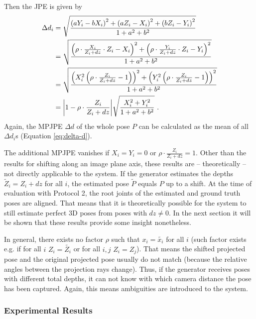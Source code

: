 Then the JPE  is given by 
\begin{align}
	\label{eq:z-shift-error}
	\Delta d_i &= \sqrt{\frac{\left (a Y_i - b X_i \right )^2 + \left (a Z_i - X_i \right )^2 + \left (b Z_i - Y_i \right )^2}{1 + a^2 + b^2}} \\ 
	&= \sqrt{\frac{\left (\rho \cdot \frac{X_i}{Z_i + dz}\cdot Z_i - X_i \right )^2 + \left (\rho \cdot \frac{Y_i }{Z_i + dz}\cdot Z_i- Y_i \right )^2}{1 + a^2 + b^2}} \\
	&= \sqrt{\frac{\left (X_i^2 \left (\rho \cdot \frac{Z_i}{Z_i + dz} - 1 \right) \right )^2 + \left (Y_i^2 \left (\rho \cdot \frac{Z_i}{Z_i + dz}-1 \right ) \right )^2}{1 + a^2 + b^2}} \\
	&= \abs{1 - \rho \cdot \frac{Z_i}{Z_i + dz}}  \sqrt{\frac{X_i^2 + Y_i^2}{1 + a^2 + b^2}}\ .
\end{align}
Again, the MPJPE $\Delta d$ of the whole pose $P$ can be calculated as the mean of all $\Delta d_i$s (Equation \eqref{eq:delta-d}).

The additional MPJPE vanishes if $X_i = Y_i = 0$ or $\rho \cdot \frac{Z_i}{Z_i + dz} = 1$.
Other than the results for shifting along an image plane axis, these results are -- theoretically -- not directly applicable to the system.
If the generator estimates the depths $\widetilde{Z}_i = Z_i + dz$ for all $i$, the estimated pose $\widetilde{P}$ equals $P$ up to a shift.
At the time of evaluation with Protocol 2, the root joints of the estimated and ground truth poses are aligned.
That means that it is theoretically possible for the system to still estimate perfect 3D poses from poses with $dz \neq 0$.
In the next section it will be shown that these results provide some insight nonetheless.

In general, there exists no factor $\rho$ such that $x_i = \widetilde{x_i}$ for all $i$ (such factor exists e.g. if for all $i$ $Z_i = \widetilde{Z_i}$ or for all $i, j$ $Z_i = Z_j$).
That means the shifted projected pose and the original projected pose usually do not match (because the relative angles between the projection rays change).
Thus, if the generator receives poses with different total depths, it can not know with which camera distance the pose has been captured.
Again, this means ambiguities are introduced to the system.

\subsubsection{Experimental Results}
\label{sec:error-on-shift-experimental}

